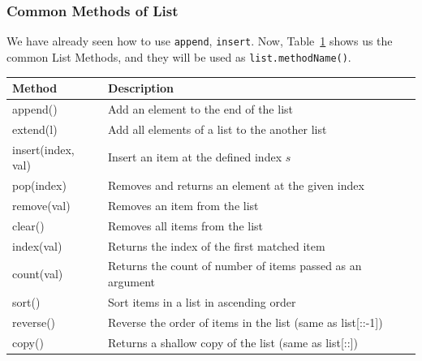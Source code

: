 \documentclass[../main.tex]{subfiles}
\begin{document}
\subsubsection{Common Methods of List} We have already seen how to use \texttt{append}, \texttt{insert}. Now, Table~\ref{tab:common_operation_list} shows us the common List Methods, and they will be used as \texttt{list.methodName()}.
\begin{table}[h]
\begin{small}
\centering
\noindent{}
 \noindent \begin{tabular}{|p{}|p{}| }
  \hline
Method & Description   \\ \hline
append()  & Add an element to the end of the list \\\hline
extend(l)  &Add all elements of a list to the another list\\ \hline
insert(index, val)  &Insert an item at the defined index $s$\\ \hline
pop(index)  &Removes and returns an element at the given index\\ \hline
remove(val) & Removes an item from the list\\ \hline
clear()  &Removes all items from the list\\ \hline
index(val) &Returns the index of the first matched item\\ \hline
count(val) &Returns the count of number of items passed as an argument\\ \hline
sort() &Sort items in a list in ascending order\\ \hline
reverse() &Reverse the order of items in the list (same as list[::-1])\\ \hline
copy() &Returns a shallow copy of the list (same as list[::])\\ \hline
\end{tabular}
  \label{tab:common_operation_list}
  \end{small}
\end{table}
\end{document}
